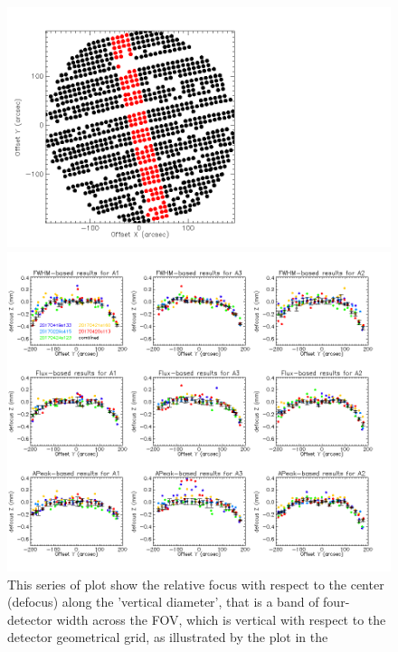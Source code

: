 \begin{figure}
  \includegraphics[trim={-2cm, 2cm, 0, 2cm}, clip, angle=0, scale=0.1]{Figures/fov_focus_stability_check_D1.png}
  \begin{center}
    \includegraphics[trim={0, 1cm, 0, 1cm}, clip, angle=0, scale=0.45]{Figures/fov_focus_1D_Vband_5.png}
  \end{center}
  \caption[Stability of the focus surface across the sequences]{This
    series of plot show the relative focus with respect to the center
    (defocus) along the 'vertical diameter', that is a band of
    four-detector width across the FOV, which is vertical with respect to
    the detector geometrical grid, as illustrated by the plot in the
}
\end{figure}
